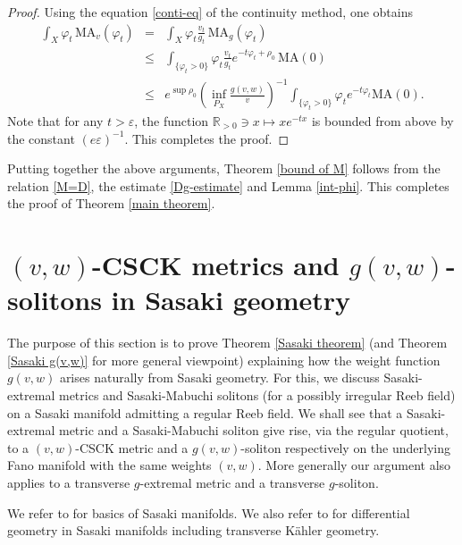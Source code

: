\documentclass[12pt]{amsart}
\numberwithin{equation}{section}%
\theoremstyle{plain}
\theoremstyle{definition}
\newcommand{\e}{\varepsilon}
\newcommand{\MA}{\mathrm{MA}}
\renewcommand{\phi}{\varphi}
\renewcommand{\leq}{\leqslant}
\newcommand{\1}{\mathbf{1}}
\begin{document}
\begin{proof}
Using the equation \eqref{conti-eq} of the continuity method,
one obtains
\begin{eqnarray*}
\int_{X}\phi_{t}\,\MA_{v}(\phi_{t})
&=&
\int_{X}\phi_{t}\frac{v_{t}}{g_{t}}\,\MA_{g}(\phi_{t})\\
&\leq&
\int_{\{\phi_{t}>0\}}\phi_{t}\frac{v_{t}}{g_{t}}e^{-t\phi_{t}+\rho_{0}}
\,\MA(0)\\
&\leq&
e^{\sup\rho_{0}}\left(\inf_{P_{X}} \frac{g(v,w)}{v}\right)^{-1}
\int_{\{\phi_{t}>0\}}\phi_{t}e^{-t\phi_{t}}\MA(0).
\end{eqnarray*}
Note that for any $t>\e$, the function $\mathbb{R}_{>0}\ni x\mapsto xe^{-tx}$
is bounded from above by the constant $(e\e)^{-1}$.
This completes the proof.
\end{proof}

Putting together the above arguments,
Theorem \ref{bound of M} follows
from the relation \eqref{M=D}, the estimate \eqref{Dg-estimate} and Lemma \ref{int-phi}.
This completes the proof of Theorem \ref{main theorem}.
\section{$(v,w)$-CSCK metrics and $g(v,w)$-solitons in Sasaki geometry}
\label{Sasaki section}
The purpose of this section is to prove Theorem \ref{Sasaki theorem}
(and Theorem \ref{Sasaki g(v,w)} for more general viewpoint)
explaining how the weight function $g(v,w)$
arises naturally from Sasaki geometry.
For this, we discuss Sasaki-extremal metrics and Sasaki-Mabuchi solitons
(for a possibly irregular Reeb field)
on a Sasaki manifold admitting a regular Reeb field.
We shall see
that a Sasaki-extremal metric and a Sasaki-Mabuchi soliton give rise,
via the regular quotient, to a $(v,w)$-CSCK metric and a $g(v,w)$-soliton
respectively on the
underlying Fano manifold with the same weights $(v,w)$.
More generally our argument also applies to a transverse $g$-extremal metric
and a transverse $g$-soliton. 

We refer to \cite{BGBook, MSY08} for basics of Sasaki manifolds.
We also refer to \cite{FOW09, CL21} for differential geometry in Sasaki manifolds
including transverse K\"ahler geometry.
\end{document}
